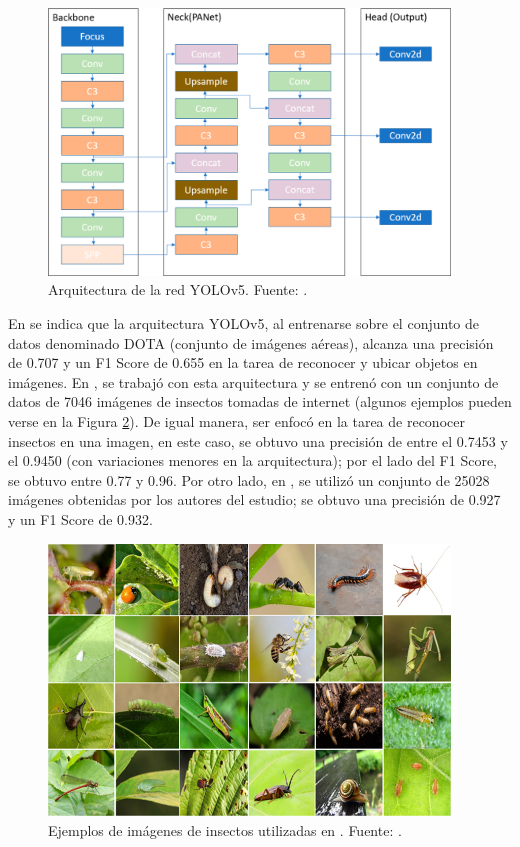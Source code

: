 \begin{figure}[ht]
    \centering
    \includegraphics[width=0.95\textwidth]{Figuras/yolov5.png}
    \caption[Arquitectura de la red YOLOv5.]{Arquitectura de la red YOLOv5. Fuente: \cite{nepal-2022}.}
    \label{fig:yolov5}
\end{figure}


En \cite{nepal-2022} se indica que la arquitectura YOLOv5, al entrenarse sobre el conjunto de datos denominado DOTA (conjunto de imágenes aéreas), alcanza una precisión de 0.707 y un F1 Score de 0.655 en la tarea de reconocer y ubicar objetos en imágenes. En \cite{ahmad-2022}, se trabajó con esta arquitectura y se entrenó con un conjunto de datos de 7046 imágenes de insectos tomadas de internet (algunos ejemplos pueden verse en la Figura \ref{fig:yolov5-insects}). De igual manera, ser enfocó en la tarea de reconocer insectos en una imagen, en este caso, se obtuvo una precisión de entre el 0.7453 y el 0.9450 (con variaciones menores en la arquitectura); por el lado del F1 Score, se obtuvo entre 0.77 y 0.96. Por otro lado, en \cite{qi-2023}, se utilizó un conjunto de 25028 imágenes obtenidas por los autores del estudio; se obtuvo una precisión de 0.927 y un F1 Score de 0.932.

\begin{figure}[ht]
    \centering
    \includegraphics[width=0.95\textwidth]{Figuras/yolov5-insects.png}
    \caption[Ejemplos de imágenes de insectos utilizadas en {[6]}.]{Ejemplos de imágenes de insectos utilizadas en \cite{ahmad-2022}. Fuente: \cite{ahmad-2022}.}
    \label{fig:yolov5-insects}
\end{figure}

